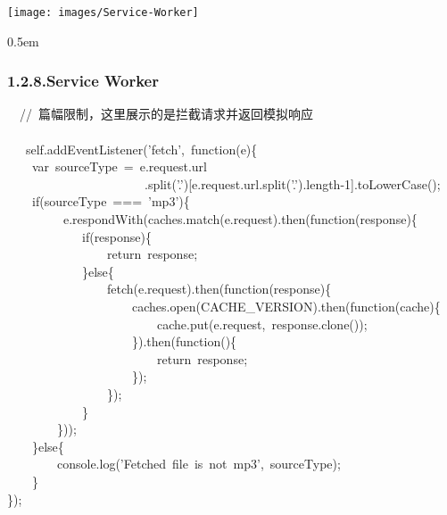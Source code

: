 \documentclass{article}
\begin{document}
\begin{mdcenter}%

\noindent{}\texttt{[image: images/Service-Worker]}{}%
\end{mdcenter}%

\begin{mdbmargintb}{}{0.5em}%
\subsubsection{1.2.8.\hspace*{0.5em}Service  Worker}\label{sec-service-worker}%
\end{mdbmargintb}%

\noindent{}%
\begin{mdpre}%
\noindent~~{//~篇幅限制，这里展示的是拦截请求并返回模拟响应}\\
~~\\
~~~self.addEventListener({'}{fetch}{'},~{function}(e)\{\\
~~~~{var}~sourceType~=~e.request.url\\
~~~~~~~~~~~~~~~~~~~~~~.split({'}{.}{'}){}[e.request.url.split({'}{.}{'}).length-{1}].toLowerCase();\\
~~~~{if}(sourceType~===~{'}{mp3}{'})\{\\
~~~~~~~~~e.respondWith(caches.match(e.request).then({function}(response)\{\\
~~~~~~~~~~~~{if}(response)\{\\
~~~~~~~~~~~~~~~~{return}~response;\\
~~~~~~~~~~~~\}{else}\{\\
~~~~~~~~~~~~~~~~fetch(e.request).then({function}(response)\{\\
~~~~~~~~~~~~~~~~~~~~caches.open(CACHE\_VERSION).then({function}(cache)\{\\
~~~~~~~~~~~~~~~~~~~~~~~~cache.put(e.request,~response.clone());\\
~~~~~~~~~~~~~~~~~~~~\}).then({function}()\{\\
~~~~~~~~~~~~~~~~~~~~~~~~{return}~response;\\
~~~~~~~~~~~~~~~~~~~~\});\\
~~~~~~~~~~~~~~~~\});\\
~~~~~~~~~~~~\}\\
~~~~~~~~\}));\\
~~~~\}{else}\{\\
~~~~~~~~console.log({'}{Fetched~file~is~not~mp3}{'},~sourceType);\\
~~~~\}\\
\});%
\end{mdpre}
\end{document}
